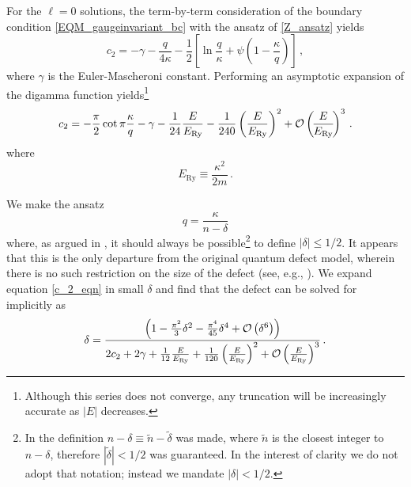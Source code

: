 \documentclass[pra,twocolumn,nofootinbib, superscriptaddress]{revtex4}%
\def\({\left(}
\def\){\right)}
\def\[{\left[}
\def\]{\right]}
\def\f#1#2{\frac{#1}{#2}}
\def\g{\gamma}
\def\de{\delta}
\def\k{\kappa}
\def\p{\pi}
\providecommand{\abs}[1]{\left\lvert#1\right\rvert}
\begin{document}
For the $\ell = 0$ solutions, the term-by-term consideration of the boundary condition \eqref{EQM_gaugeinvariant_bc} with the ansatz of \eqref{Z_ansatz} yields
\begin{equation}
c_2=-\gamma -\f{q}{4\k} - \f{1}{2}\[\ln{\f{q}{\k}} +\psi\(1-\f{\k}{q}\)\]\,,
\end{equation}
where $\g$ is the Euler-Mascheroni constant.  Performing an asymptotic expansion of the digamma function yields\footnote{Although this series does not converge, any truncation will be increasingly accurate as $\abs{E}$ decreases.}
\begin{equation}\label{c_2_eqn}
c_2=-\f{\p}{2} \cot{\p \f{\k}{q}}-\gamma -\f{1}{24} \f{E}{E_\text{Ry}} - \f{1}{240} \(\f{E}{E_\text{Ry}}\)^2 +{\cal O}\(\!\f{E}{E_\text{Ry}}\!\)^3   \,. %
\end{equation}
where
\begin{equation}
E_\text{Ry}\equiv\f{\k^2}{2m}\,.
\end{equation}



 
We make the ansatz 
\begin{equation}\label{q_defect_ansatz}
q=\f{\k}{n-\de}
\end{equation}
where, as argued in \cite{Jacobs:2019woc}, it should always be possible\footnote{In \cite{Jacobs:2019woc} the definition $n-\de\equiv\tilde{n}-\tilde{\de}$ was made, where $\tilde{n}$ is the closest integer to  $n-\de$, therefore $\abs{\tilde{\de}}<1/2$ was guaranteed. In the interest of clarity we do not adopt that notation; instead we mandate $\abs{\de}<1/2$.} to define $\abs{\de}\leq 1/2$. It appears that this is the only departure from the original quantum defect model, wherein there is no such restriction on the size of the defect (see, e.g., \cite{gallagher_1994}).  We expand equation \eqref{c_2_eqn} in small $\de$ and find that the defect can be solved for implicitly as
\begin{multline}\label{shitballs_0}
\de =     \f{\(1-\f{\p^2}{3}\de^2 -\f{\p^4}{45}\de^4  + {\cal O}\(\de^6\)\)}{2c_2 + 2\gamma +\f{1}{12} \f{E}{E_\text{Ry}} + \f{1}{120} \(\f{E}{E_\text{Ry}}\)^2 +{\cal O}\(\f{E}{E_\text{Ry}}\)^3 } \,. %
\end{multline}
\end{document}
